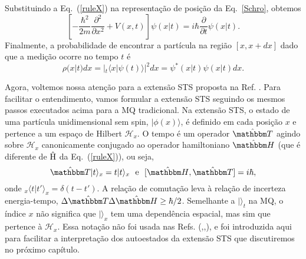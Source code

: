 Substituindo a Eq.~(\ref{ruleX}) na representação de posição da Eq.~\eqref{Schro}, obtemos
\begin{equation}\label{Schro2}
\left[-\frac{\hbar^2}{2m}\frac{\partial^2}{\partial x^2}+V(x,t)\right] \psi(x|t)=i\hbar \frac{\partial}{\partial t}{\psi ( x|t)}.
\end{equation}
Finalmente, a probabilidade de encontrar a partícula na região $[x,x+dx]$ dado que a medição ocorre no tempo $t$ é
\begin{equation}\label{rhoX}
\rho(x|t) dx=|{_t\langle} x|\psi(t)\rangle|^2dx=\psi^{*}(x|t)\psi(x|t) dx.
\end{equation}


Agora, voltemos nossa atenção para a extensão STS proposta na Ref. \cite{Dias}. Para facilitar o entendimento, vamos formular a extensão STS seguindo os mesmos passos executados acima para a MQ tradicional. Na extensão STS, o estado de uma partícula unidimensional sem spin, $|\phi(x)\rangle$, é definido em cada posição $x$ e pertence a um espaço de Hilbert ${\mathcal H}_{x}$. O tempo é um operador ${\hat {\mathbbm T}}$ agindo sobre ${\mathcal H}_{x}$ canonicamente conjugado ao operador hamiltoniano ${\hat {\mathbbm H}}$ (que é diferente de ${\hat {\textrm H}}$ da Eq.~(\ref{ruleX})), ou seja,
\begin{equation}\label{time}
{\hat {\mathbbm T}}|t\rangle_{x} =t|t\rangle_{x}~~{ \text{e}}~~ [{\hat {\mathbbm H}}, {\hat{\mathbbm T}}]=i\hbar,
\end{equation}
onde ${_x \langle} t|t' \rangle_x=\delta (t-t')$. A relação de comutação leva à relação de incerteza energia-tempo, $\Delta {\hat {\mathbbm T}} \Delta {\hat {\mathbbm H}} \geq \hbar/2 $. Semelhante a $|\rangle_t$ na MQ, o índice $x$ não significa que $|\rangle_x$ tem uma dependência espacial, mas sim que pertence à ${\mathcal H}_x$. Essa notação não foi usada nas Refs. (\cite{Dias},\cite{Ricardo},\cite{Parana}), e foi introduzida aqui para facilitar a interpretação dos autoestados da extensão STS que discutiremos no próximo capítulo.


